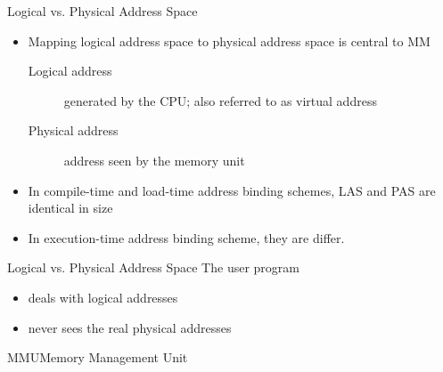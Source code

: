 \begin{frame}{Logical vs. Physical Address Space}
  \begin{itemize}
  \item Mapping logical address space to physical address space is central to MM
    \begin{description}
    \item[Logical address] generated by the CPU; also referred to as \alert{virtual
        address}
    \item[Physical address] address seen by the memory unit
    \end{description}
  \item In compile-time and load-time address binding schemes, LAS and PAS are identical
    in size
  \item In execution-time address binding scheme, they are differ.
  \end{itemize}
\end{frame}

\begin{frame}{Logical vs. Physical Address Space}%
  The user program
  \begin{itemize}
  \item deals with logical addresses
  \item never sees the real physical addresses
  \end{itemize}
  \centering
\end{frame}

\begin{frame}{MMU}{Memory Management Unit}
  \centering
  \mode<beamer>{ \texttt{[image: mos-figs-4-9]} }%
\end{frame}

